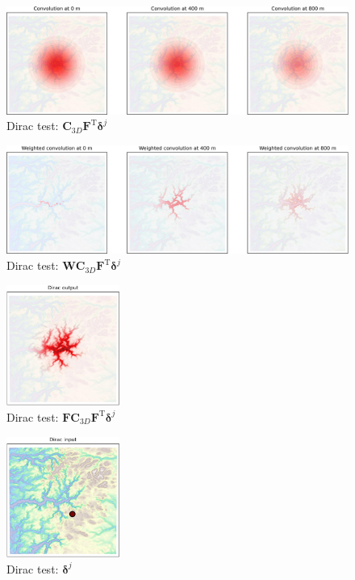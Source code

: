\documentclass[12pt]{scrartcl}
\begin{document}
\begin{figure}[h!]
\centering
\includegraphics[width=\textwidth]{bottom_3-convolution.jpg}
\caption{Dirac test: $\mathbf{C}_{3D} \mathbf{F}^\text{T} \boldsymbol{\delta}^j$} \label{fig:bottom_3-convolution}
\end{figure}

\begin{figure}[h!]
\centering
\includegraphics[width=\textwidth]{bottom_4-weighted_convolution.jpg}
\caption{Dirac test: $\mathbf{W} \mathbf{C}_{3D} \mathbf{F}^\text{T} \boldsymbol{\delta}^j$} \label{fig:bottom_4-weighted_convolution}
\end{figure}

\begin{figure}[h!]
\centering
\includegraphics[width=0.33\textwidth]{bottom_5-dirac_output.jpg}
\caption{Dirac test: $\mathbf{F} \mathbf{C}_{3D} \mathbf{F}^\text{T} \boldsymbol{\delta}^j$} \label{fig:bottom_5-dirac_output}
\end{figure}

\begin{figure}[h!]
\centering
\includegraphics[width=0.33\textwidth]{top_1-dirac_input.jpg}
\caption{Dirac test: $\boldsymbol{\delta}^j$} \label{fig:top_1-dirac_input}
\end{figure}
\end{document}
